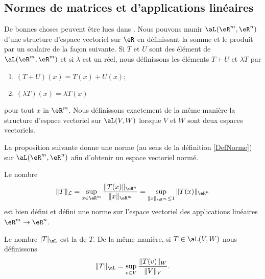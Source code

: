 \subsection{Normes de matrices et d'applications linéaires}
\label{subsecNomrApplLin}

De bonnes choses peuvent être lues dans \cite{BrunelleMatricielle}. Nous pouvons munir $\aL(\eR^m, \eR^n)$ d'une structure d'espace vectoriel sur $\eR$ en définissant la somme et le produit par un scalaire de la façon suivante. Si $T$ et $U$ sont des élément de $\aL(\eR^m,\eR^m)$ et si $\lambda$ est un réel, nous définissons les éléments $T+U$ et $\lambda T$ par
\begin{enumerate}
	\item
		$(T+U)(x)=T(x)+U(x)$;
	\item
		$(\lambda T)(x)=\lambda T(x)$
\end{enumerate}
pour tout $x$ in $\eR^m$. Nous définissons exactement de la même manière la structure d'espace vectoriel sur $\aL(V,W)$ lorsque $V$ et $W$ sont deux espaces vectoriels. 

La proposition suivante donne une norme (au sens de la définition \ref{DefNorme}) sur $\aL(\eR^m,\eR^n)$ afin d'obtenir un espace vectoriel normé.
\begin{proposition}		\label{DefNormeAppLineaire}
    Le nombre
	\begin{equation}
		\|T\|_{\mathcal{L}}=\sup_{x\in\eR^m}\frac{\|T(x)\|_{\eR^n}}{\|x\|_{\eR^m}}=\sup_{\|x\|_{\eR^m}\leq 1}\|T(x)\|_{\eR^n}
	\end{equation}
    est bien défini et défini une norme sur l'espace vectoriel des applications linéaires \( \eR^m\to \eR^n\).
\end{proposition}
Le nombre \( | T |_{\aL}\) est la  de $T$. De la même manière, si $T\in\aL(V,W)$ nous définissons
\begin{equation}
    \| T \|_{\aL}=\sup_{v\in V}\frac{ \| T(v) \|_W }{ \| V \|_V }.
\end{equation}

